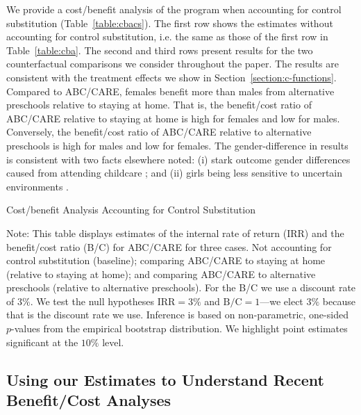 We provide a cost/benefit analysis of the program when accounting for control substitution (Table~\ref{table:cbacs}). The first row shows the estimates without accounting for control substitution, i.e. the same as those of the first row in Table~\ref{table:cba}. The second and third rows present results for the two counterfactual comparisons we consider throughout the paper. The results are consistent with the treatment effects we show in Section~\ref{section:c-functions}. Compared to ABC/CARE, females benefit more than males from alternative preschools relative to staying at home. That is, the benefit/cost ratio of ABC/CARE relative to staying at home is high for females and low for males. Conversely, the benefit/cost ratio of ABC/CARE relative to alternative preschools is high for males and low for females. The gender-difference in results is consistent with two facts elsewhere noted: (i) stark outcome gender differences caused from attending childcare \citep{Kottelenberg-Lehrer_2014_Gender-Effects,Baker_Gruber_Milligan_2015_Noncog_Defects,Doyle-etal_2015_Econ-Hum-Bio,Doyle-etal_2016_PLoS-ONE}; and (ii) girls being less sensitive to uncertain environments \citep{Autor-etal_2015_Family-Disadvantage}.

\begin{table}[!htbp]
\begin{threeparttable}
\caption{Cost/benefit Analysis Accounting for Control Substitution}
\label{table:cbacs}
\centering

\begin{tablenotes}
\footnotesize
\item Note: This table displays estimates of the internal rate of return (IRR) and the benefit/cost ratio (B/C) for ABC/CARE for three cases. Not accounting for control substitution (baseline); comparing ABC/CARE to staying at home (relative to staying at home); and comparing ABC/CARE to alternative preschools (relative to alternative preschools). For the B/C we use a discount rate of $3\%$. We test the null hypotheses $\text{IRR} = 3\%$ and $\text{B/C} = 1$---we elect $3\%$ because that is the discount rate we use. Inference is based on non-parametric, one-sided $p$-values from the empirical bootstrap distribution. We highlight point estimates significant at the $10\%$ level.
\end{tablenotes}
\end{threeparttable}
\end{table}

\subsection{Using our Estimates to Understand Recent Benefit/Cost Analyses}

